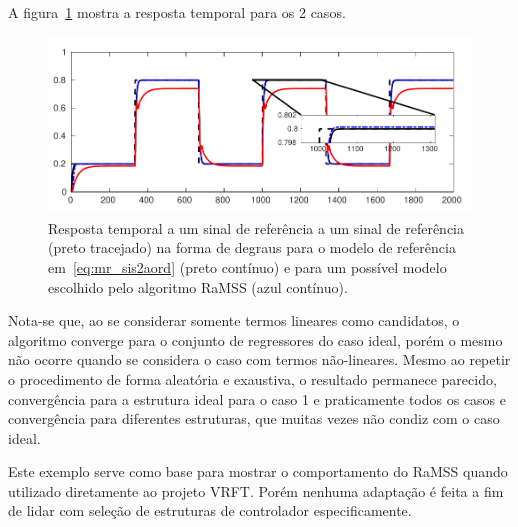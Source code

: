 \begin{exmp}
A figura~\ref{fig:Figs-RespostaSist2aordNARX-png} mostra a resposta temporal para os 2 casos.
\begin{figure}[H]
    \centering
    \includegraphics[width=1\textwidth]{Figs/sis2aord2-cropped.pdf}
    \caption{Resposta temporal a um sinal de referência a um sinal de referência (preto tracejado) na forma de degraus para o modelo de referência em~\eqref{eq:mr_sis2aord} (preto contínuo) e para um possível modelo escolhido pelo algoritmo RaMSS (azul contínuo).}
    \label{fig:Figs-RespostaSist2aordNARX-png}
\end{figure}

 
Nota-se que, ao se considerar somente termos lineares como candidatos, o algoritmo converge para o conjunto de regressores do caso ideal, porém o mesmo não ocorre quando se considera o caso com termos não-lineares. Mesmo ao repetir o procedimento de forma aleatória e exaustiva, o resultado permanece parecido, convergência para a estrutura ideal para o caso 1 e praticamente todos os casos e convergência para diferentes estruturas, que muitas vezes não condiz com o caso ideal.

Este exemplo serve como base para mostrar o comportamento do RaMSS quando utilizado diretamente ao projeto VRFT\@. Porém nenhuma adaptação é feita a fim de lidar com seleção de estruturas de controlador especificamente.

\end{exmp}



